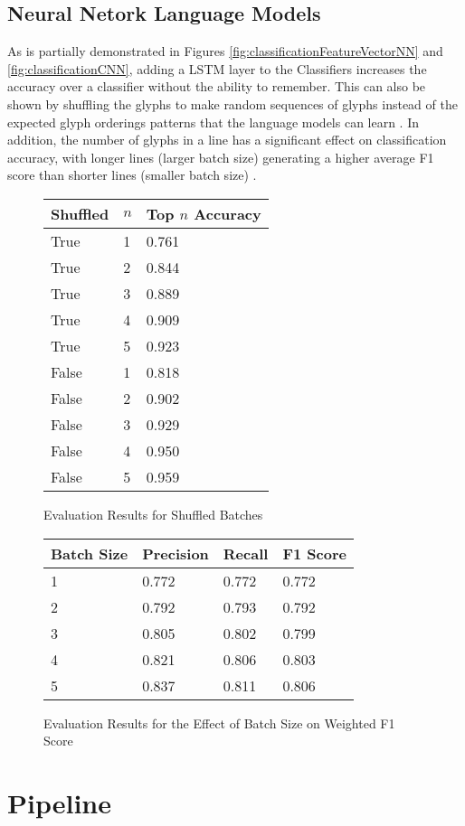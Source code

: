\subsection{Neural Netork Language Models}

As is partially demonstrated in Figures \ref{fig:classificationFeatureVectorNN} and \ref{fig:classificationCNN}, adding a LSTM layer to the Classifiers increases the accuracy over a classifier without the ability to remember. This can also be shown by shuffling the glyphs to make random sequences of glyphs instead of the expected glyph orderings patterns that the language models can learn . In addition, the number of glyphs in a line has a significant effect on classification accuracy, with longer lines (larger batch size) generating a higher average F1 score than shorter lines (smaller batch size) .

\begin{figure}[H]
    \caption{Evaluation Results for Shuffled Batches}
    \label{fig:classificationShuffle}
    \centering
    \begin{tabular}{ | l | l | l | }
        \hline
        Shuffled & $n$ & Top $n$ Accuracy \\
        \hline
        True & 1 & 0.761 \\
        True & 2 & 0.844 \\
        True & 3 & 0.889 \\
        True & 4 & 0.909 \\
        True & 5 & 0.923 \\
        False & 1 & 0.818 \\
        False & 2 & 0.902 \\
        False & 3 & 0.929 \\
        False & 4 & 0.950 \\
        False & 5 & 0.959 \\
        \hline
    \end{tabular}
\end{figure}

\begin{figure}[H]
    \caption{Evaluation Results for the Effect of Batch Size on Weighted F1 Score}
    \label{fig:classificationBatchSize}
    \centering
    \begin{tabular}{ | l | l | l | l | }
        \hline
        Batch Size & Precision & Recall & F1 Score \\
        \hline
        1 & 0.772 & 0.772 & 0.772 \\
        2 & 0.792 & 0.793 & 0.792 \\
        3 & 0.805 & 0.802 & 0.799 \\
        4 & 0.821 & 0.806 & 0.803 \\
        5 & 0.837 & 0.811 & 0.806 \\
        \hline
    \end{tabular}
\end{figure}

\section{Pipeline}
